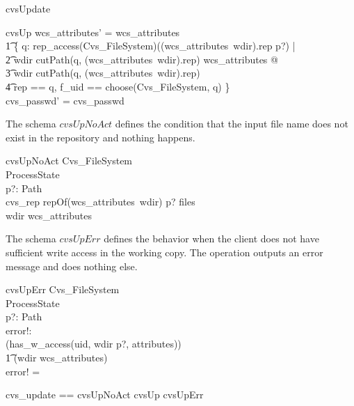 \begin{doc}{cvsUpdate}
\begin{schema}{cvsUp}
    wcs\_attributes' = wcs\_attributes \cup \\
    \t1 \{ q: rep\_access(\theta Cvs\_FileSystem)((wcs\_attributes~wdir).rep
    \cat p?) | \\ 
    \t2 wdir \cat cutPath(q, (wcs\_attributes~wdir).rep) \notin \dom
    wcs\_attributes @ \\  
    \t3 wdir \cat cutPath(q, (wcs\_attributes~wdir).rep) \\
    \t4 \mapsto \lblot \< rep == q, f\_uid == choose(\theta Cvs\_FileSystem, q)
    \rblot \} \> \\  
    cvs\_passwd' = cvs\_passwd \\
  \end{schema}
  The schema $cvsUpNoAct$ defines the condition that the input file name does not exist in
  the repository and nothing happens.
  \begin{schema}{cvsUpNoAct}
    \Xi Cvs\_FileSystem\\
    \Xi ProcessState \\
    p?: Path \\
    \where
    cvs\_rep \cat repOf(wcs\_attributes~wdir) \cat p? \notin \dom files \\
    wdir \in \dom wcs\_attributes \\
  \end{schema}
  The schema $cvsUpErr$ defines the behavior when the client does not have sufficient write
  access in the working copy.  The operation outputs an error message and does
  nothing else.
  \begin{schema}{cvsUpErr}
    \Xi Cvs\_FileSystem\\
    \Xi ProcessState \\
    p?: Path \\
    error!: \denotation \\
    \where
    \lnot (has\_w\_access(uid, wdir \cat p?, attributes)) \\
    \t1 \lor \lnot (wdir \in \dom wcs\_attributes) \\
    error! =  \\
  \end{schema}
  \begin{zed}
    cvs\_update == cvsUpNoAct  \lor cvsUp \lor cvsUpErr \\
  \end{zed}
\end{doc}

